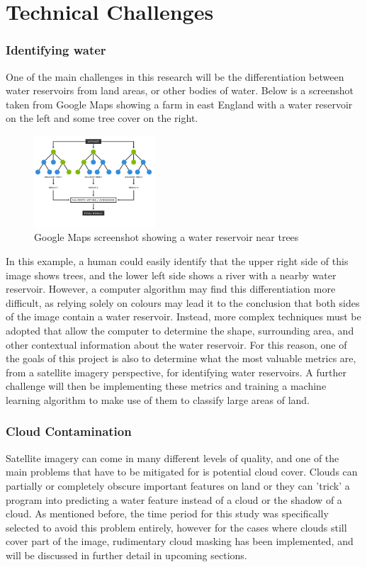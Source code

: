 \section{Technical Challenges}
\subsubsection{Identifying water}
One of the main challenges in this research will be the differentiation between water reservoirs from land areas, or other bodies of water. Below is a screenshot taken from Google Maps showing a farm in east England with a water reservoir on the left and some tree cover on the right. 

\begin{figure}[H]
\centering
\includegraphics[width=0.4\textwidth]{contents/figures/LR RF diagram.jpg}
\caption{Google Maps screenshot showing a water reservoir near trees}
\label{fig:NISH}
\end{figure}

In this example, a human could easily identify that the upper right side of this image shows trees, and the lower left side shows a river with a nearby water reservoir. However, a computer algorithm may find this differentiation more difficult, as relying solely on colours may lead it to the conclusion that both sides of the image contain a water reservoir. Instead, more complex techniques must be adopted that allow the computer to determine the shape, surrounding area, and other contextual information about the water reservoir. For this reason, one of the goals of this project is also to determine what the most valuable metrics are, from a satellite imagery perspective, for identifying water reservoirs. A further challenge will then be implementing these metrics and training a machine learning algorithm to make use of them to classify large areas of land. 

\subsubsection{Cloud Contamination}
Satellite imagery can come in many different levels of quality, and one of the main problems that have to be mitigated for is potential cloud cover. Clouds can partially or completely obscure important features on land or they can 'trick' a program into predicting a water feature instead of a cloud or the shadow of a cloud. As mentioned before, the time period for this study was specifically selected to avoid this problem entirely, however for the cases where clouds still cover part of the image, rudimentary cloud masking has been implemented, and will be discussed in further detail in upcoming sections. 

